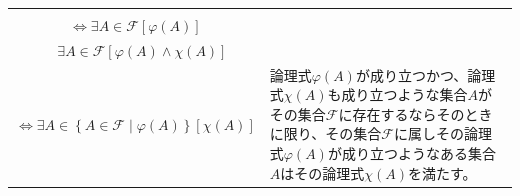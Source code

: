 \documentclass[a4paper]{jsarticle}
\begin{document}
\begin{thm}
\begin{longtable}[c]{|c|l|}
\begin{tabular}{l}
$\quad \exists A\in \mathcal{F}\left[ A\in \mathcal{F \Rightarrow}\varphi(A) \right] $\\
$\Leftrightarrow \exists A\in \mathcal{F}\left[ \varphi(A) \right] $\\
$\quad \exists A\in \mathcal{F}\left[ \varphi(A) \land \chi(A) \right] $\\ 
$\Leftrightarrow \exists A \in \left\{ A\in \mathcal{F} \middle| \varphi(A) \right\}\left[ \chi(A) \right] $
\end{tabular} & \begin{minipage}{0.5\textwidth}
論理式$\varphi(A)$が成り立つかつ、論理式$\chi(A)$も成り立つような集合$A$がその集合$\mathcal{F}$に存在するならそのときに限り、その集合$\mathcal{F}$に属しその論理式$\varphi(A)$が成り立つようなある集合$A$はその論理式$\chi(A)$を満たす。
\end{minipage} \\
\hline
\end{longtable}
\end{thm}
\end{document}
